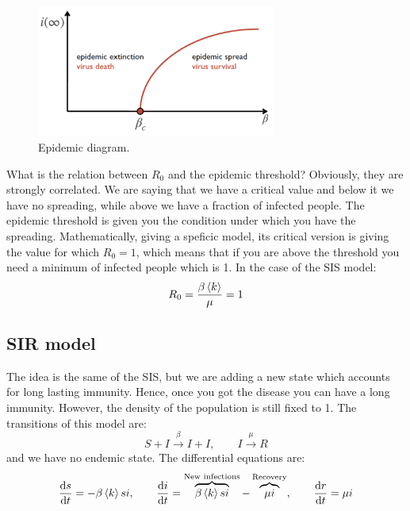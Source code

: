 \documentclass[../main/main.tex]{subfiles}
\begin{document}
\begin{figure}[h!]
\centering
\includegraphics[width=0.7\textwidth]{../lessons/image/03/5.png}
\caption{\label{fig:3_5} Epidemic diagram.}
\end{figure}

What is the relation between \( R_0 \) and the epidemic threshold? Obviously, they are strongly correlated. We are saying that we have a critical value and below it we have no spreading, while above we have a fraction of infected people.
The epidemic threshold is given you the condition under which you have the spreading. Mathematically, giving a speficic model, its critical version is giving the value for which \( R_0=1 \), which means that if you are above the threshold you need a minimum of infected people which is 1.  In the case of the SIS model:
\begin{equation*}
  R_0 = \frac{\beta \expval{k} }{\mu } = 1
\end{equation*}


\subsection{SIR model}
The idea is the same of the SIS, but we are adding a new state which accounts for long lasting immunity. Hence, once you got the disease you can have a long immunity. However, the density of the population is still fixed to 1. The transitions of this model are:
\begin{equation*}
  S + I \overset{\beta }{\rightarrow } I + I, \qquad I \overset{\mu }{\rightarrow } R
\end{equation*}
and we have no endemic state.
The differential equations are:
\begin{equation*}
  \dv{s}{t} = - \beta \expval{k} si, \qquad \dv{i}{t} = \overbrace{\beta \expval{k} si}^{\text{New infections}}  - \overbrace{\mu i}^{\text{Recovery}}, \qquad  \dv{r}{t} = \mu i
\end{equation*}
\end{document}
